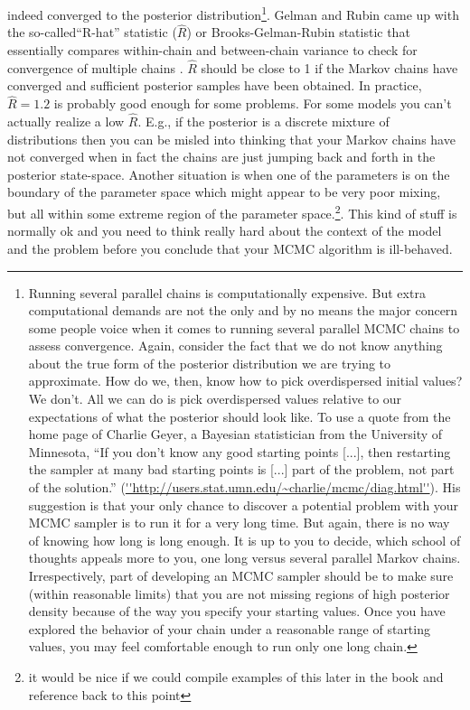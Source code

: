 indeed converged to the posterior distribution\footnote{Running
  several parallel chains is computationally expensive. But extra
  computational demands are not the only and by no means the major
  concern some people voice when it comes to running several parallel
  MCMC chains to assess convergence. Again, consider the fact that we
  do not know anything about the true form of the posterior
  distribution we are trying to approximate. How do we, then, know how
  to pick overdispersed initial values? We don't. All we can do is
  pick overdispersed values relative to our expectations of what the
  posterior should look like. To use a quote from the home page of
  Charlie Geyer, a Bayesian statistician from the University of
  Minnesota, ``If you don't know any good starting points [...], then
  restarting the sampler at many bad starting points is [...] part of
  the problem, not part of the solution.''
  (\url{''http://users.stat.umn.edu/~charlie/mcmc/diag.html''}). His suggestion
  is that your only chance to discover a potential problem with your
  MCMC sampler is to run it for a very long time. But again, there is
  no way of knowing how long is long enough.  It is up to you to
  decide, which school of thoughts appeals more to you, one long
  versus several parallel Markov chains. Irrespectively, part of
  developing an MCMC sampler should be to make sure (within reasonable
  limits) that you are not missing regions of high posterior density
  because of the way you specify your starting values. Once you have
  explored the behavior of your chain under a reasonable range of
  starting values, you may feel comfortable enough to run only one
  long chain.}. Gelman and Rubin came up with the so-called``R-hat''
statistic ($\hat{R}$) or Brooks-Gelman-Rubin statistic that
essentially compares within-chain and between-chain variance to check
for convergence of multiple chains \citep{gelman_etal:1996}. $\hat{R}$
should be close to 1 if the Markov chains have converged and
sufficient posterior samples have been obtained. In practice, $\hat{R}
= 1.2$ is probably good enough for some problems.  For some models you
can't actually realize a low $\hat{R}$. E.g., if the posterior is a
discrete mixture of distributions then you can be misled into thinking
that your Markov chains have not converged when in fact the chains are
just jumping back and forth in the posterior state-space.
Another situation is when one of the parameters is on the boundary of
the parameter space which might appear to be very poor mixing, but all
within some extreme region of the parameter space.\footnote{it would
  be nice if we could compile examples of this later in the book and
  reference back to this point}.
This
kind of stuff is normally ok and you need to think really hard about
the context of the model and the problem before you conclude that your
MCMC algorithm is ill-behaved.

